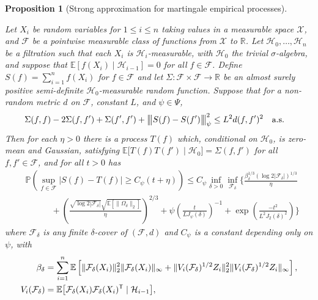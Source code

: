 \documentclass[11pt,lof]{puthesis}
\renewcommand{\P}{\ensuremath{\mathbb{P}}}
\newcommand{\R}{\ensuremath{\mathbb{R}}}
\newcommand{\E}{\ensuremath{\mathbb{E}}}
\newcommand{\cH}{\ensuremath{\mathcal{H}}}
\newcommand{\cF}{\ensuremath{\mathcal{F}}}
\newcommand{\cX}{\ensuremath{\mathcal{X}}}
\newcommand{\T}{\ensuremath{\mathsf{T}}}
\newcommand{\bigvvvert}{{\big\vert\kern-0.35ex\big\vert\kern-0.35ex\big\vert}}
\theoremstyle{break}
\newtheorem{proposition}{Proposition}[section]
\theoremstyle{proof}
\begin{document}
\begin{proposition}[Strong approximation for martingale empirical processes]%
  \label{pro:yurinskii_emp_proc}

  Let $X_i$ be random variables for $1 \leq i \leq n$ taking values in a
  measurable space $\cX$, and $\cF$ be a pointwise measurable class of
  functions from $\cX$ to $\R$. Let $\cH_0, \ldots, \cH_n$ be a filtration such
  that each $X_i$ is $\cH_i$-measurable, with $\cH_0$ the trivial
  $\sigma$-algebra, and suppose that $\E[f(X_i) \mid \cH_{i-1}] = 0$ for all
  $f \in \cF$. Define $S(f) = \sum_{i=1}^n f(X_i)$ for $f\in\cF$ and let
  $\Sigma: \cF \times \cF \to \R$ be an almost surely positive semi-definite
  $\cH_0$-measurable random function. Suppose that for a non-random
  metric $d$ on $\cF$, constant $L$, and $\psi \in \Psi$,
  \begin{align}%
    \label{eq:yurinskii_emp_proc_var}
    \Sigma(f,f) - 2\Sigma(f,f') + \Sigma(f',f')
    + \bigvvvert S(f) - S(f') \bigvvvert_\psi^2
    &\leq L^2 d(f,f')^2 \quad \text{a.s.}
  \end{align}
  Then for each $\eta > 0$ there is a process $T(f)$
  which, conditional on $\cH_0$, is zero-mean and Gaussian,
  satisfying $\E\big[ T(f) T(f') \mid \cH_0 \big] = \Sigma(f,f')$
  for all $f, f' \in \cF$, and for all $t > 0$ has
  \begin{align*}
    &\P\left(
      \sup_{f \in \cF}
      \big| S(f) - T(f) \big|
      \geq C_\psi(t + \eta)
    \right)
    \leq
    C_\psi
    \inf_{\delta > 0}
    \inf_{\cF_\delta}
    \Bigg\{
      \frac{\beta_\delta^{1/3} (\log 2 |\cF_\delta|)^{1/3}}{\eta } \\
      &\qquad\quad+
      \left(\frac{\sqrt{\log 2 |\cF_\delta|}
      \sqrt{\E\left[\|\Omega_\delta\|_2\right]}}{\eta }\right)^{2/3}
      + \psi\left(\frac{t}{L J_\psi(\delta)}\right)^{-1}
      + \exp\left(\frac{-t^2}{L^2 J_2(\delta)^2}\right)
    \Bigg\}
  \end{align*}
  where $\cF_\delta$ is any finite $\delta$-cover of $(\cF,d)$
  and $C_\psi$ is a constant depending only on $\psi$, with
  \begin{align*}
    \beta_\delta
    &= \sum_{i=1}^n
    \E\left[ \|\cF_\delta(X_i)\|^2_2\|\cF_\delta(X_i)\|_\infty
      + \|V_i(\cF_\delta)^{1/2}Z_i\|^2_2
    \|V_i(\cF_\delta)^{1/2}Z_i\|_\infty \right], \\
    V_i(\cF_\delta)
    &=
    \E\big[\cF_\delta(X_i) \cF_\delta(X_i)^\T \mid \cH_{i-1} \big],
    \hspace*{27.7mm}

\end{align*}
\end{proposition}
\end{document}
